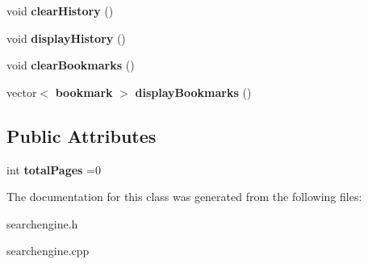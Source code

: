 \begin{DoxyCompactItemize}
\item 
void {\bfseries clear\+History} ()\label{class_search_engine_a5ddd80c981473501dab71fa019356c46}

\item 
void {\bfseries display\+History} ()\label{class_search_engine_a1c690004902e31c701f584fdbdec5438}

\item 
void {\bfseries clear\+Bookmarks} ()\label{class_search_engine_addcad78e40a60301848ceb89426d64d3}

\item 
vector$<$ {\bf bookmark} $>$ {\bfseries display\+Bookmarks} ()\label{class_search_engine_ab461f4ce41e02d2405ce8fad949a49bb}

\end{DoxyCompactItemize}
\subsection*{Public Attributes}
\begin{DoxyCompactItemize}
\item 
int {\bfseries total\+Pages} =0\label{class_search_engine_a833ba7e860c954284b64a83e1e3556d8}

\end{DoxyCompactItemize}


The documentation for this class was generated from the following files\+:\begin{DoxyCompactItemize}
\item 
searchengine.\+h\item 
searchengine.\+cpp\end{DoxyCompactItemize}
